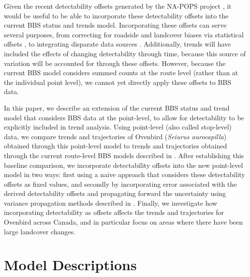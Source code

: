 Given the recent detectability offsets generated by the NA-POPS project \citep{edwards_point_2023}, it would be useful to be able to incorporate these detectability offsets into the current BBS status and trends model. 
Incorporating these offsets can serve several purposes, from correcting for roadside and landcover biases via statistical offsets \citep{thogmartin_sensitivity_2010, solymos_lessons_2020, edwards_point_2023}, to integrating disparate data sources \citep{solymos_calibrating_2013, edwards_point_2023}.
Additionally, trends will have included the effects of changing detectability through time, because this source of variation will be accounted for through these offsets.
However, because the current BBS model considers summed counts at the route level (rather than at the individual point level), we cannot yet directly apply these offsets to BBS data. 

\par In this paper, we describe an extension of the current BBS status and trend model \citep{smith_spatially_2023} that considers BBS data at the point-level, to allow for detectability to be explicitly included in trend analysis. 
Using point-level (also called stop-level) data, we compare trends and trajectories of Ovenbird (\textit{Seiurus aurocapilla}) obtained through this point-level model to trends and trajectories obtained through the current route-level BBS models described in \citet{smith_spatially_2023}.
After establishing this baseline comparison, we incorporate detectability offsets into the new point-level model in two ways: first using a naive approach that considers these detectability offsets as fixed values, and secondly by incorporating error associated with the derived detectability offsets and propagating forward the uncertainty using variance propagation methods described in \citet{bravington_variance_2021}.
Finally, we investigate how incorporating detectability as offsets affects the trends and trajectories for Ovenbird across Canada, and in particular focus on areas where there have been large landcover changes.

\section{Model Descriptions}

